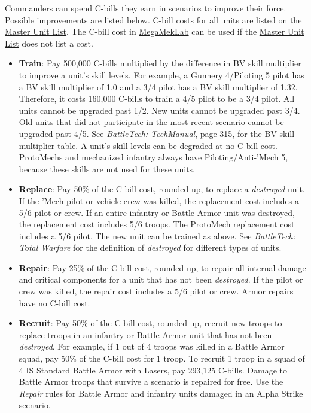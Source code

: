 Commanders can spend C-bills they earn in scenarios to improve their force.
Possible improvements are listed below.
C-bill costs for all units are listed on the \href{http://www.masterunitlist.info}{Master Unit List}.
The C-bill cost in \href{https://megamek.org}{MegaMekLab} can be used if the \href{http://www.masterunitlist.info}{Master Unit List} does not list a cost.

\begin{itemize}

\item {\bfseries Train}: Pay 500,000 C-bills multiplied by the difference in BV skill multiplier to improve a unit's skill levels.
For example, a Gunnery 4/Piloting 5 pilot has a BV skill multiplier of 1.0 and a 3/4 pilot has a BV skill multiplier of 1.32.
Therefore, it costs 160,000 C-bills to train a 4/5 pilot to be a 3/4 pilot.
All units cannot be upgraded past 1/2.
New units cannot be upgraded past 3/4.
Old units that did not participate in the most recent scenario cannot be upgraded past 4/5.
See \emph{BattleTech: TechManual}, page 315, for the BV skill multiplier table.
A unit's skill levels can be degraded at no C-bill cost.
ProtoMechs and mechanized infantry always have Piloting/Anti-'Mech 5, because these skills are not used for these units.

\item {\bfseries Replace}: Pay 50\% of the C-bill cost, rounded up, to replace a \emph{destroyed} unit.
If the 'Mech pilot or vehicle crew was killed, the replacement cost includes a 5/6 pilot or crew.
If an entire infantry or Battle Armor unit was destroyed, the replacement cost includes 5/6 troops.
The ProtoMech replacement cost includes a 5/6 pilot.
The new unit can be trained as above.
See \emph{BattleTech: Total Warfare} for the definition of \emph{destroyed} for different types of units.

\item {\bfseries Repair}: Pay 25\% of the C-bill cost, rounded up, to repair all internal damage and critical components for a unit that has not been \emph{destroyed}.
If the pilot or crew was killed, the repair cost includes a 5/6 pilot or crew.
Armor repairs have no C-bill cost.

\item {\bfseries Recruit}: Pay 50\% of the C-bill cost, rounded up, recruit new troops to replace troops in an infantry or Battle Armor unit that has not been \emph{destroyed}.
For example, if 1 out of 4 troops was killed in a Battle Armor squad, pay 50\% of the C-bill cost for 1 troop.
To recruit 1 troop in a squad of 4 IS Standard Battle Armor with Lasers, pay 293,125 C-bills.
Damage to Battle Armor troops that survive a scenario is repaired for free.
Use the \emph{Repair} rules for Battle Armor and infantry units damaged in an Alpha Strike scenario.


\end{itemize}
